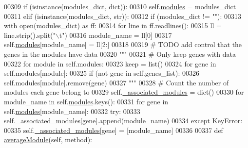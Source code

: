 \begin{DoxyCode}
00309         \textcolor{keywordflow}{if} (isinstance(modules\_dict, dict)):
00310             self.\hyperlink{classnavicom_1_1navicom_1_1NaviCom_a56141660ddf29a36a8291e938246578c}{modules} = modules\_dict 
00311         \textcolor{keywordflow}{elif} (isinstance(modules\_dict, str)):
00312             \textcolor{keywordflow}{if} (modules\_dict != \textcolor{stringliteral}{""}):
00313                 with open(modules\_dict) \textcolor{keyword}{as} ff:
00314                     \textcolor{keywordflow}{for} line \textcolor{keywordflow}{in} ff.readlines():
00315                         ll = line.strip().split(\textcolor{stringliteral}{"\(\backslash\)t"})
00316                         module\_name = ll[0]
00317                         self.\hyperlink{classnavicom_1_1navicom_1_1NaviCom_a56141660ddf29a36a8291e938246578c}{modules}[module\_name] = ll[2:]
00318 
00319         \textcolor{comment}{# TODO add control that the genes in the modules have data}
00320         \textcolor{stringliteral}{"""}
00321 \textcolor{stringliteral}{        # Only keep genes with data}
00322 \textcolor{stringliteral}{        for module in self.modules:}
00323 \textcolor{stringliteral}{            keep = list()}
00324 \textcolor{stringliteral}{            for gene in self.modules[module]:}
00325 \textcolor{stringliteral}{                if (not gene in self.genes\_list):}
00326 \textcolor{stringliteral}{                    self.modules[module].remove(gene)}
00327 \textcolor{stringliteral}{        """}
00328         \textcolor{comment}{# Count the number of modules each gene belong to}
00329         self.\hyperlink{classnavicom_1_1navicom_1_1NaviCom_abc04e5310dba9a8c2dd2037281464727}{_associated_modules} = dict()
00330         \textcolor{keywordflow}{for} module\_name \textcolor{keywordflow}{in} self.\hyperlink{classnavicom_1_1navicom_1_1NaviCom_a56141660ddf29a36a8291e938246578c}{modules}.keys():
00331             \textcolor{keywordflow}{for} gene \textcolor{keywordflow}{in} self.\hyperlink{classnavicom_1_1navicom_1_1NaviCom_a56141660ddf29a36a8291e938246578c}{modules}[module\_name]:
00332                 \textcolor{keywordflow}{try}:
00333                     self.\hyperlink{classnavicom_1_1navicom_1_1NaviCom_abc04e5310dba9a8c2dd2037281464727}{_associated_modules}[gene].append(module\_name)
00334                 \textcolor{keywordflow}{except} KeyError:
00335                     self.\hyperlink{classnavicom_1_1navicom_1_1NaviCom_abc04e5310dba9a8c2dd2037281464727}{_associated_modules}[gene] = [module\_name]
00336 
00337     \textcolor{keyword}{def }\hyperlink{classnavicom_1_1navicom_1_1NaviCom_afd1a299b687bc97e171cff0a738b7b73}{averageModule}(self, method):

\end{DoxyCode}
